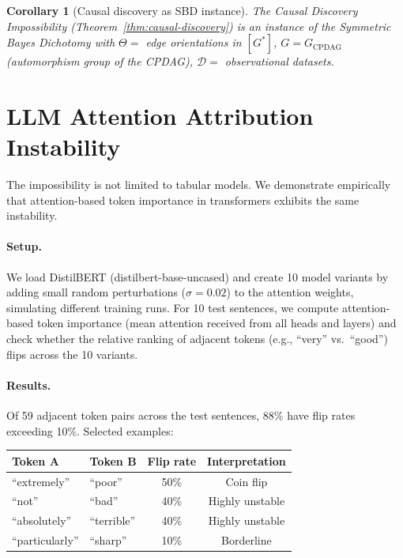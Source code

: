 \documentclass{article}
\newtheorem{corollary}[theorem]{Corollary}
\begin{document}
\begin{corollary}[Causal discovery as SBD instance]
\label{cor:causal-discovery-instance}
The Causal Discovery Impossibility (Theorem~\ref{thm:causal-discovery})
is an instance of the Symmetric Bayes Dichotomy with
$\Theta =$ edge orientations in $[G^*]$,
$G = G_{\text{CPDAG}}$ (automorphism group of the CPDAG),
$\mathcal{D} =$ observational datasets.
\end{corollary}

\section{LLM Attention Attribution Instability}

The impossibility is not limited to tabular models. We demonstrate
empirically that attention-based token importance in transformers
exhibits the same instability.

\paragraph{Setup.}
We load DistilBERT (distilbert-base-uncased) and create 10 model
variants by adding small random perturbations ($\sigma = 0.02$) to
the attention weights, simulating different training runs. For 10
test sentences, we compute attention-based token importance (mean
attention received from all heads and layers) and check whether
the relative ranking of adjacent tokens (e.g., ``very'' vs.\ ``good'')
flips across the 10 variants.

\paragraph{Results.}
Of 59 adjacent token pairs across the test sentences, 88\% have
flip rates exceeding 10\%. Selected examples:

\begin{center}
\small
\begin{tabular}{@{}llcc@{}}
\toprule
Token A & Token B & Flip rate & Interpretation \\
\midrule
``extremely'' & ``poor'' & 50\% & Coin flip \\
``not'' & ``bad'' & 40\% & Highly unstable \\
``absolutely'' & ``terrible'' & 40\% & Highly unstable \\
``particularly'' & ``sharp'' & 10\% & Borderline \\
\bottomrule
\end{tabular}
\end{center}
\end{document}
